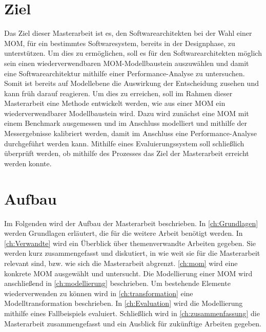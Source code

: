 \section{Ziel}
Das Ziel dieser Masterarbeit ist es, den Softwarearchitekten bei der Wahl einer MOM, für ein bestimmtes  Softwaresystem, bereits in der Designphase, zu unterstützen. Um dies zu ermöglichen, soll es für den Softwarearchitekten möglich sein einen wiederverwendbaren MOM-Modellbaustein auszuwählen und damit eine Softwarearchitektur mithilfe einer Performance-Analyse zu untersuchen. Somit ist bereits auf Modellebene die Auswirkung der Entscheidung zusehen und kann früh darauf reagieren. Um dies zu erreichen, soll im Rahmen dieser Masterarbeit eine Methode entwickelt werden, wie aus einer MOM ein wiederverwendbarer Modellbaustein wird. Dazu wird zunächst eine MOM mit einem Benchmark ausgemessen und im Anschluss modelliert und mithilfe der Messergebnisse kalibriert werden, damit im Anschluss eine Performance-Analyse durchgeführt werden kann. Mithilfe eines Evaluierungssystem soll schließlich überprüft werden, ob mithilfe des Prozesses das Ziel der Masterarbeit erreicht werden konnte.

\section{Aufbau}
Im Folgenden wird der Aufbau der Masterarbeit beschrieben. In \autoref{ch:Grundlagen} werden Grundlagen erläutert, die für die weitere Arbeit benötigt werden. In \autoref{ch:Verwandte} wird ein Überblick über themenverwandte Arbeiten gegeben. Sie werden kurz zusammengefasst und diskutiert, in
wie weit sie für die Masterarbeit relevant sind, bzw. wie sich die Masterarbeit abgrenzt. \autoref{ch:mom} wird eine konkrete MOM ausgewählt und untersucht. Die Modellierung einer MOM wird anschließend in \autoref{ch:modellierung} beschrieben. Um bestehende Elemente wiederverwenden zu können wird in \autoref{ch:transformation} eine Modelltransformation beschrieben. In \autoref{ch:Evaluation} wird die Modellierung mithilfe eines Fallbeispiels evaluiert. Schließlich wird in \autoref{ch:zusammenfassung} die Masterarbeit zusammengefasst und ein Ausblick für zukünftige Arbeiten gegeben.


